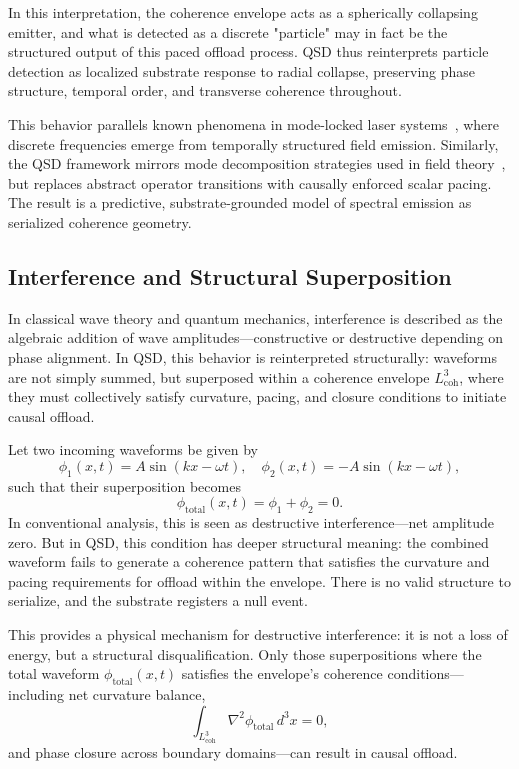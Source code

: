 \documentclass[entropy,article,submit,pdftex,moreauthors]{Definitions/mdpi}
\begin{document}
In this interpretation, the coherence envelope acts as a spherically collapsing emitter, and what is detected as a discrete "particle" may in fact be the structured output of this paced offload process. QSD thus reinterprets particle detection as localized substrate response to radial collapse, preserving phase structure, temporal order, and transverse coherence throughout.

This behavior parallels known phenomena in mode-locked laser systems~\cite{loudon2000}, where discrete frequencies emerge from temporally structured field emission. Similarly, the QSD framework mirrors mode decomposition strategies used in field theory~\cite{griffiths1995, peskin1995}, but replaces abstract operator transitions with causally enforced scalar pacing. The result is a predictive, substrate-grounded model of spectral emission as serialized coherence geometry.

\subsection{Interference and Structural Superposition}
In classical wave theory and quantum mechanics, interference is described as the algebraic addition of wave amplitudes—constructive or destructive depending on phase alignment. In QSD, this behavior is reinterpreted structurally: waveforms are not simply summed, but superposed within a coherence envelope \( L_{\text{coh}}^3 \), where they must collectively satisfy curvature, pacing, and closure conditions to initiate causal offload.

Let two incoming waveforms be given by
\[
\phi_1(x, t) = A \sin(kx - \omega t), \quad \phi_2(x, t) = -A \sin(kx - \omega t),
\]
such that their superposition becomes
\[
\phi_{\text{total}}(x, t) = \phi_1 + \phi_2 = 0.
\]
In conventional analysis, this is seen as destructive interference—net amplitude zero. But in QSD, this condition has deeper structural meaning: the combined waveform fails to generate a coherence pattern that satisfies the curvature and pacing requirements for offload within the envelope. There is no valid structure to serialize, and the substrate registers a null event.

This provides a physical mechanism for destructive interference: it is not a loss of energy, but a structural disqualification. Only those superpositions where the total waveform \( \phi_{\text{total}}(x, t) \) satisfies the envelope’s coherence conditions—including net curvature balance,
\[
\int_{L_{\text{coh}}^3} \nabla^2 \phi_{\text{total}} \, d^3x = 0,
\]
and phase closure across boundary domains—can result in causal offload.
\end{document}
